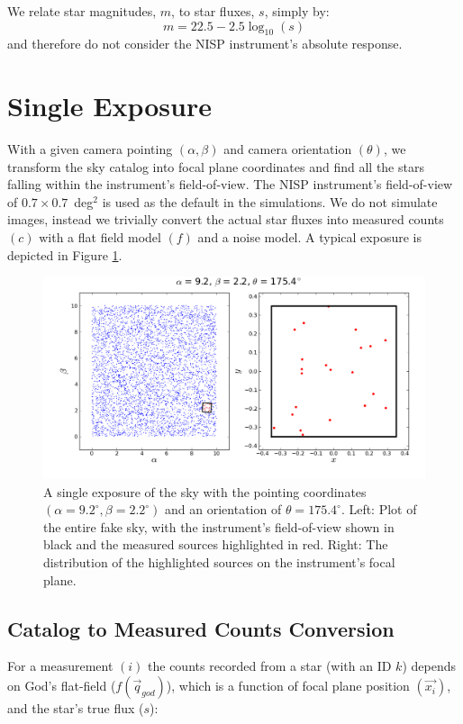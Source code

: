 \documentclass[manuscript]{aastex}
\begin{document}
We relate star magnitudes, $m$, to star fluxes, $s$, simply by:
\begin{displaymath}
m = 22.5 - 2.5\log_{10}(s)
\end{displaymath}
and therefore do not consider the NISP instrument's absolute response.

\section{Single Exposure}
With a given camera pointing $(\alpha, \beta)$ and camera orientation $(\theta)$, we transform the sky catalog into focal plane coordinates and find all the stars falling within the instrument's field-of-view. The NISP instrument's field-of-view of $0.7 \times 0.7$~deg$^{2}$ is used as the default in the simulations. We do not simulate images, instead we trivially convert the actual star fluxes into measured counts $(c)$ with a flat field model $(f)$ and a noise model. A typical exposure is depicted in Figure \ref{fig:camera}.

\begin{figure}[ht]
\begin{center}
\includegraphics[width=\textwidth]{camera_image.png}
\end{center}
\caption{A single exposure of the sky with the pointing coordinates $(\alpha = 9.2^\circ, \beta = 2.2^\circ)$ and an orientation of $\theta = 175.4^\circ$. Left: Plot of the entire fake sky, with the instrument's field-of-view shown in black and the measured sources highlighted in red. Right: The distribution of the highlighted sources on the instrument's focal plane. \label{fig:camera}}
\end{figure}

\subsection{Catalog to Measured Counts Conversion}
For a measurement $(i)$ the counts recorded from a star (with an ID $k$) depends on God's flat-field ($f(\vec{q}_{god})$), which is a function of focal plane position $(\vec{x_i})$, and the star's true flux ($s$): 
\end{document}
